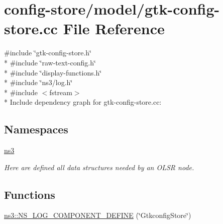 \hypertarget{gtk-config-store_8cc}{}\section{config-\/store/model/gtk-\/config-\/store.cc File Reference}
\label{gtk-config-store_8cc}
{\ttfamily \#include \char`\"{}gtk-\/config-\/store.\+h\char`\"{}}\\*
{\ttfamily \#include \char`\"{}raw-\/text-\/config.\+h\char`\"{}}\\*
{\ttfamily \#include \char`\"{}display-\/functions.\+h\char`\"{}}\\*
{\ttfamily \#include \char`\"{}ns3/log.\+h\char`\"{}}\\*
{\ttfamily \#include $<$fstream$>$}\\*
Include dependency graph for gtk-\/config-\/store.cc\+:
\subsection*{Namespaces}
\begin{DoxyCompactItemize}
\item 
 \hyperlink{namespacens3}{ns3}
\begin{DoxyCompactList}\small\item\em Here are defined all data structures needed by an O\+L\+SR node. \end{DoxyCompactList}\end{DoxyCompactItemize}
\subsection*{Functions}
\begin{DoxyCompactItemize}
\item 
\hyperlink{namespacens3_a1466223838fb533102f1ddaf967a282e}{ns3\+::\+N\+S\+\_\+\+L\+O\+G\+\_\+\+C\+O\+M\+P\+O\+N\+E\+N\+T\+\_\+\+D\+E\+F\+I\+NE} (\char`\"{}Gtkconfig\+Store\char`\"{})
\end{DoxyCompactItemize}
